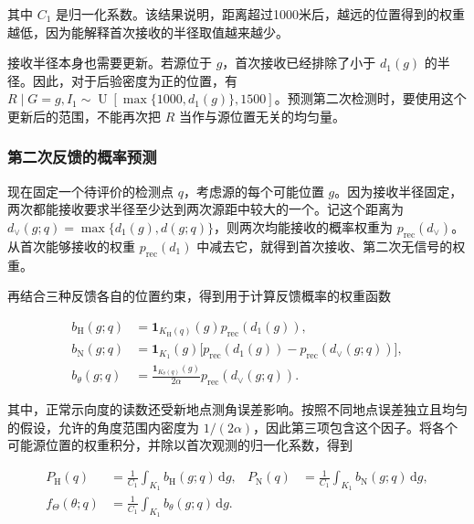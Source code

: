 其中 \(C_1\) 是归一化系数。该结果说明，距离超过1000米后，越远的位置得到的权重越低，因为能解释首次接收的半径取值越来越少。

接收半径本身也需要更新。若源位于 \(g\)，首次接收已经排除了小于 \(d_1(g)\) 的半径。因此，对于后验密度为正的位置，有 \(R\mid G=g,I_1\sim\operatorname{U}[\max\{1000,d_1(g)\},1500]\)。预测第二次检测时，要使用这个更新后的范围，不能再次把 \(R\) 当作与源位置无关的均匀量。

\subsubsection{第二次反馈的概率预测}

现在固定一个待评价的检测点 \(q\)，考虑源的每个可能位置 \(g\)。因为接收半径固定，两次都能接收要求半径至少达到两次源距中较大的一个。记这个距离为 \(d_\vee(g;q)=\max\{d_1(g),d(g;q)\}\)，则两次均能接收的概率权重为 \(p_{\mathrm{rec}}(d_\vee)\)。从首次能够接收的权重 \(p_{\mathrm{rec}}(d_1)\) 中减去它，就得到首次接收、第二次无信号的权重。

再结合三种反馈各自的位置约束，得到用于计算反馈概率的权重函数

\begin{equation}
\begin{aligned}
 b_{\mathrm H}(g;q)&=\mathbf1_{K_{\mathrm H}(q)}(g)p_{\mathrm{rec}}(d_1(g)),\\
 b_{\mathrm N}(g;q)&=\mathbf1_{K_1}(g)\bigl[p_{\mathrm{rec}}(d_1(g))-p_{\mathrm{rec}}(d_\vee(g;q))\bigr],\\
 b_\theta(g;q)&=\frac{\mathbf1_{K_\theta(q)}(g)}{2\alpha}p_{\mathrm{rec}}(d_\vee(g;q)).
\end{aligned}
\label{eq:q2-pair-feedback-weights}
\end{equation}

其中，正常示向度的读数还受新地点测角误差影响。按照不同地点误差独立且均匀的假设，允许的角度范围内密度为 \(1/(2\alpha)\)，因此第三项包含这个因子。将各个可能源位置的权重积分，并除以首次观测的归一化系数，得到

\begin{equation}
\begin{aligned}
 P_{\mathrm H}(q)&=\frac{1}{C_1}\int_{K_1}b_{\mathrm H}(g;q)\,\mathrm dg,
 &P_{\mathrm N}(q)&=\frac{1}{C_1}\int_{K_1}b_{\mathrm N}(g;q)\,\mathrm dg,\\
 f_\Theta(\theta;q)&=\frac{1}{C_1}\int_{K_1}b_\theta(g;q)\,\mathrm dg.
\end{aligned}
\label{eq:q2-pair-prediction}
\end{equation}

